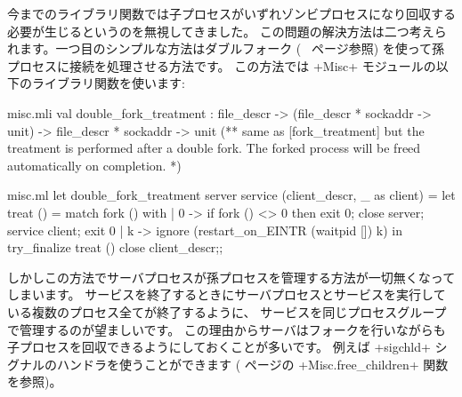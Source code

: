 今までのライブラリ関数では子プロセスがいずれゾンビプロセスになり回収する必要が生じるというのを無視してきました。
この問題の解決方法は二つ考えられます。一つ目のシンプルな方法はダブルフォーク (~\pageref{double-fork} ページ参照)
を使って孫プロセスに接続を処理させる方法です。
この方法では \ml+Misc+ モジュールの以下のライブラリ関数を使います:
%
\begin{codefile}{misc.mli}
val double_fork_treatment :
file_descr -> (file_descr * sockaddr -> unit) ->
file_descr * sockaddr -> unit
(** same as [fork_treatment] but the treatment is performed after a double
   fork. The forked process will be freed automatically on
   completion. *)
\end{codefile}
%
\begin{listingcodefile}{misc.ml}
let double_fork_treatment server service (client_descr, _ as client) =
  let treat () = match fork () with
    | 0 ->
        if fork () <> 0 then exit 0;
        close server; service client; exit 0
    | k ->
        ignore (restart_on_EINTR (waitpid []) k)
  in
  try_finalize treat () close client_descr;;
\end{listingcodefile}
%
しかしこの方法でサーバプロセスが孫プロセスを管理する方法が一切無くなってしまいます。
サービスを終了するときにサーバプロセスとサービスを実行している複数のプロセス全てが終了するように、
サービスを同じプロセスグループで管理するのが望ましいです。
この理由からサーバはフォークを行いながらも子プロセスを回収できるようにしておくことが多いです。
例えば \ml+sigchld+ シグナルのハンドラを使うことができます (\pageref{ex/childs} ページの
\ml+Misc.free_children+ 関数を参照)。

